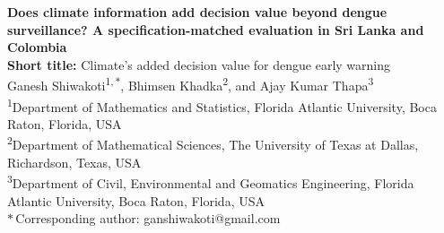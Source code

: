 \documentclass[11pt,a4paper]{article}
\begin{document}
\linenumbers

\thispagestyle{fancy}
\begin{center}
{\Large \textbf{Does climate information add decision value beyond dengue surveillance? A specification-matched evaluation in Sri Lanka and Colombia}}\\[1.0em]

{\normalsize \textbf{Short title:} Climate's added decision value for dengue early warning}\\[1.2em]

Ganesh Shiwakoti\textsuperscript{1,\,$\ast$}, Bhimsen Khadka\textsuperscript{2}, and Ajay Kumar Thapa\textsuperscript{3}\\[0.6em]

\footnotesize
\textsuperscript{1}Department of Mathematics and Statistics, Florida Atlantic University, Boca Raton, Florida, USA\\
\textsuperscript{2}Department of Mathematical Sciences, The University of Texas at Dallas, Richardson, Texas, USA\\
\textsuperscript{3}Department of Civil, Environmental and Geomatics Engineering, Florida Atlantic University, Boca Raton, Florida, USA\\[0.3em]
$\ast$\,Corresponding author: ganshiwakoti@gmail.com
\end{center}


\newpage
\end{document}
